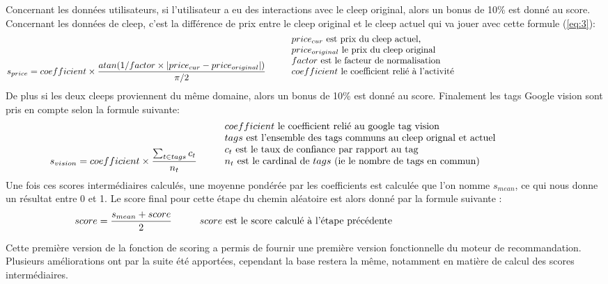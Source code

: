 \documentclass{article} %
\begin{document}
Concernant les données utilisateurs, si l'utilisateur a eu des interactions avec le cleep original, alors un bonus de 10\% est donné au score.\\

Concernant les données de cleep, c'est la différence de prix entre le cleep original et le cleep actuel qui va jouer avec cette formule (\ref{eq:3}):
\begin{equation}
\label{eq:3}
s_{price} = coefficient\times\frac{atan(1/factor \times |price_{cur} - price_{original}| )}{\pi/2} \hspace{1cm} \mbox{\vbox{\noindent $price_{cur}$ est prix du cleep actuel,\\ $price_{original}$ le prix du cleep original \\ $factor$ est le facteur de normalisation \\ $coefficient$ le coefficient relié à l'activité}}
\end{equation}
De plus si les deux cleeps proviennent du même domaine, alors un bonus de 10\% est donné au score. Finalement les tags Google vision sont pris en compte selon la formule suivante:
\begin{equation}
\label{eq:4}
s_{vision} = coefficient\times \frac{\sum_{t \in tags}c_{t}}{n_{t}}
\hspace{1cm} \mbox{\vbox{\noindent $coefficient$ le coefficient relié au google tag vision\\
$tags$ est l'ensemble des tags communs au cleep orignal et actuel\\
$c_{t}$ est le taux de confiance par rapport au tag\\
$n_{t}$ est le cardinal de $tags$ (ie le nombre de tags en commun)}}
\end{equation}
\newpage
Une fois ces scores intermédiaires calculés, une moyenne pondérée par les coefficients est calculée que l'on nomme $s_{mean}$, ce qui nous donne un résultat entre 0 et 1. Le score final pour cette étape du chemin aléatoire est alors donné par la formule suivante :
\begin{equation}
\label{eq:5}
score = \frac{s_{mean} + score}{2}
\hspace{1cm} \mbox{\vbox{\noindent $score$ est le score calculé à l'étape précédente}}
\end{equation}

Cette première version de la fonction de scoring a permis de fournir une première version fonctionnelle du moteur de recommandation. Plusieurs améliorations ont par la suite été apportées, cependant la base restera la même, notamment en matière de calcul des scores intermédiaires.
\end{document}
